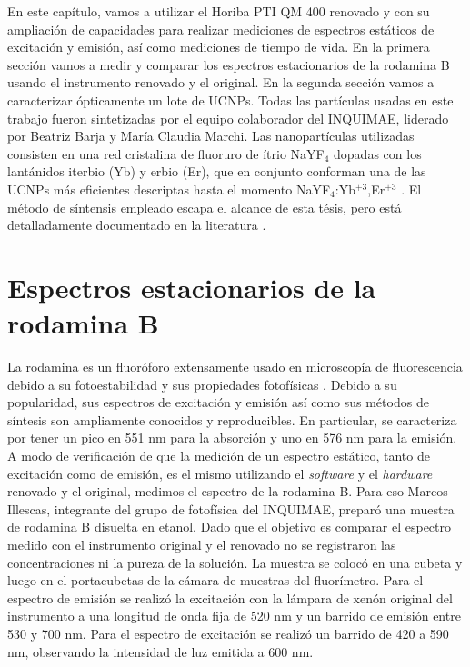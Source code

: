 

En este capítulo, vamos a utilizar el Horiba PTI QM 400 renovado y con su ampliación de capacidades para realizar mediciones de espectros estáticos de excitación y emisión, así como mediciones de tiempo de vida.
En la primera sección vamos a medir y comparar los espectros estacionarios de la rodamina B usando el instrumento renovado y el original.
En la segunda sección vamos a caracterizar ópticamente un lote de UCNPs.
Todas las partículas usadas en este trabajo fueron sintetizadas por el equipo colaborador del INQUIMAE, liderado por Beatriz Barja y María Claudia Marchi. 
Las nanopartículas utilizadas consisten en una red cristalina de fluoruro de ítrio NaYF$_4$ dopadas con los lantánidos iterbio (Yb) y erbio (Er), que en conjunto conforman una de las UCNPs más eficientes descriptas hasta el momento NaYF$_4$:Yb$^{+3}$,Er$^{+3}$ \cite{caracterizacion_ucnps_unicas}.
El método de síntensis empleado escapa el alcance de esta tésis, pero está detalladamente documentado en la literatura \cite{Zhang2012}.

\section{Espectros estacionarios de la rodamina B}

La rodamina es un fluoróforo extensamente usado en microscopía de fluorescencia debido a su fotoestabilidad y sus propiedades fotofísicas \cite{beija_synthesis_2009,rodamina_caracterizacion}.
Debido a su popularidad, sus espectros de excitación y emisión así como sus métodos de síntesis son ampliamente conocidos y reproducibles.
En particular, se caracteriza por tener un pico en 551 nm para la absorción y uno en 576 nm para la emisión.
A modo de verificación de que la medición de un espectro estático, tanto de excitación como de emisión, es el mismo utilizando el \textit{software} y el \textit{hardware} renovado y el original, medimos el espectro de la rodamina B.
Para eso Marcos Illescas, integrante del grupo de fotofísica del INQUIMAE, preparó una muestra de rodamina B disuelta en etanol.
Dado que el objetivo es comparar el espectro medido con el instrumento original y el renovado no se registraron las concentraciones ni la pureza de la solución.
La muestra se colocó en una cubeta y luego en el portacubetas de la cámara de muestras del fluorímetro.
Para el espectro de emisión se realizó la excitación con la lámpara de xenón original del instrumento a una longitud de onda fija de 520 nm y un barrido de emisión entre 530 y 700 nm.
Para el espectro de excitación se realizó un barrido de 420 a 590 nm, observando la intensidad de luz emitida a 600 nm.


